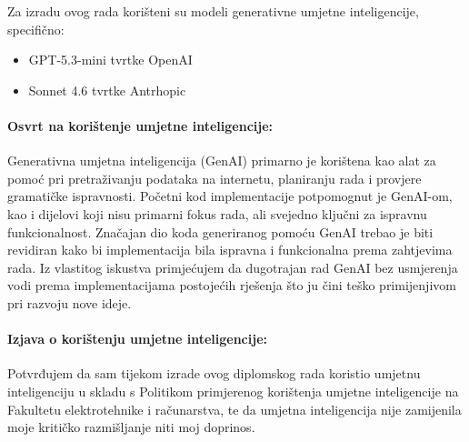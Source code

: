 \documentclass[diplomskirad,upload]{fer}
\begin{document}


\begin{izjavaoui}

Za izradu ovog rada korišteni su modeli generativne umjetne inteligencije, specifično:
\begin{itemize}
    \item GPT-5.3-mini tvrtke OpenAI
    \item Sonnet 4.6 tvrtke Antrhopic
\end{itemize}

\paragraph{Osvrt na korištenje umjetne inteligencije:}
    Generativna umjetna inteligencija (GenAI) primarno je korištena kao alat za pomoć
    pri pretraživanju podataka na internetu, planiranju rada i provjere
    gramatičke ispravnosti. Početni kod
    implementacije potpomognut je GenAI-om, kao i dijelovi koji nisu primarni
    fokus rada, ali svejedno ključni za ispravnu funkcionalnost. Značajan dio
    koda generiranog pomoću GenAI trebao je biti revidiran kako bi
    implementacija bila ispravna i funkcionalna prema zahtjevima rada.
    Iz vlastitog iskustva primjećujem da dugotrajan rad GenAI bez usmjerenja
    vodi prema implementacijama postojećih rješenja što ju čini teško
    primijenjivom pri razvoju nove ideje.

\paragraph{Izjava o korištenju umjetne inteligencije:}
    Potvrđujem da sam tijekom izrade ovog diplomskog rada koristio umjetnu inteligenciju u skladu s
    Politikom primjerenog korištenja umjetne inteligencije na Fakultetu elektrotehnike i računarstva,
    te da umjetna inteligencija nije zamijenila moje kritičko razmišljanje niti moj doprinos.

\end{izjavaoui}

\backmatter
\end{document}
